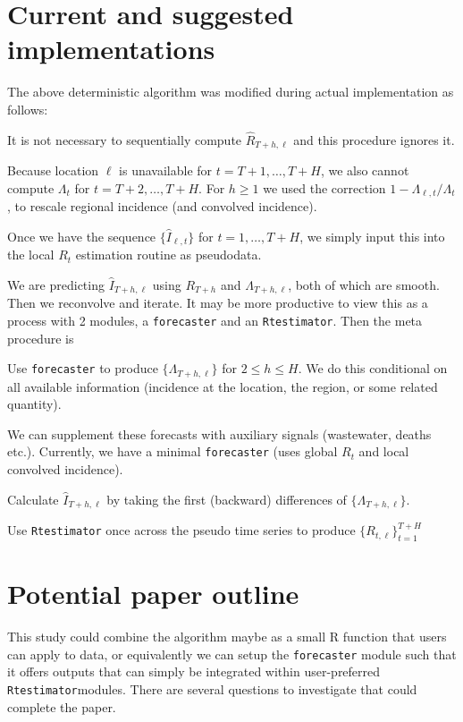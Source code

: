 \documentclass[12pt]{article}
\begin{document}
\section*{Current and suggested implementations}\label{sec:implement}

The above deterministic algorithm was modified during actual implementation as
follows:

\bitem
\item It is not necessary to sequentially compute $\hat{R}_{T+h, \ell}$ and this
procedure ignores it. 
\item Because location $\ell$ is unavailable for $t=T+1,\ldots,T+H$, we also
cannot compute $\Lambda_t$ for $t=T+2,\ldots,T+H$. For $h \geq 1$ we used the
correction $1 - \Lambda_{\ell, t}/\Lambda_{t}$, to rescale regional incidence
(and convolved incidence).
\item Once we have the sequence $\{\hat{I}_{\ell, t}\}$ for $t=1,\ldots,T+H$, we
simply input this into the local $R_t$ estimation routine as pseudodata.
\eitem

We are predicting $\hat{I}_{T + h, \ell}$ using $R_{T+h}$ and
$\Lambda_{T+h, \ell}$, both of which are smooth. Then we reconvolve and
iterate. It may be more productive to view this as a process with 2 modules, a
\texttt{forecaster} and an \texttt{Rtestimator}. Then the meta procedure is

\benum
\item Use \texttt{forecaster} to produce $\{\Lambda_{T+h, \ell}\}$ for $2\leq h
\leq H$. We do this conditional on all available information (incidence at the
location, the region, or some related quantity). 
\item We can supplement these forecasts with auxiliary signals (wastewater,
deaths etc.). Currently, we have a minimal \texttt{forecaster} (uses global $R_t$
and local convolved incidence).
\item Calculate $\hat{I}_{T+h, \ell}$ by taking the first (backward) differences
of $\{\Lambda_{T+h, \ell}\}$.
\item Use \texttt{Rtestimator} once across the pseudo time series to produce
$\{R_{t, \ell}\}_{t=1}^{T+H}$
\eenum

\section*{Potential paper outline}\label{sec:outline}

This study could combine the algorithm maybe as a small R function that users
can apply to data, or equivalently we can setup the \texttt{forecaster} module
such that it offers outputs that can simply be integrated within user-preferred
\texttt{Rtestimator}modules. There are several questions to investigate that
could complete the paper. 
\end{document}
